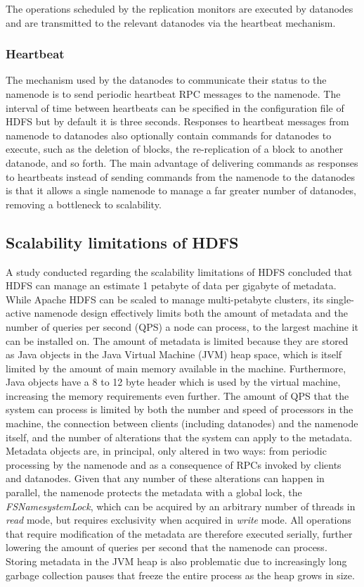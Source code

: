 The operations scheduled by the replication monitors are executed by datanodes and are transmitted to the relevant datanodes via the heartbeat mechanism.

\subsubsection{Heartbeat}
\label{sec:heartbeat}
The mechanism used by the datanodes to communicate their status to the namenode is to send periodic heartbeat RPC messages to the namenode.
The interval of time between heartbeats can be specified in the configuration file of HDFS but by default it is three seconds.
Responses to heartbeat messages from namenode to datanodes also optionally contain commands for datanodes to execute, such as the deletion of blocks, the re-replication of a block to another datanode, and so forth.
The main advantage of delivering commands as responses to heartbeats instead of sending commands from the namenode to the datanodes is that it allows a single namenode to manage a far greater number of datanodes, removing a bottleneck to scalability.

\subsection{Scalability limitations of HDFS}
\label{sec:scalability-limitations}
A study conducted regarding the scalability limitations of HDFS \cite{shvachko2010hdfs} concluded that HDFS can manage an estimate 1 petabyte of data per gigabyte of metadata.
While Apache HDFS can be scaled to manage multi-petabyte clusters, its single-active namenode design effectively limits both the amount of metadata and the number of queries per second (QPS) a node can process, to the largest machine it can be installed on.
The amount of metadata is limited because they are stored as Java objects in the Java Virtual Machine (JVM) heap space, which is itself limited by the amount of main memory available in the machine.
Furthermore, Java objects have a 8 to 12 byte header which is used by the virtual machine, increasing the memory requirements even further.
The amount of QPS that the system can process is limited by both the number and speed of processors in the machine, the connection between clients (including datanodes) and the namenode itself, and the number of alterations that the system can apply to the metadata.
Metadata objects are, in principal, only altered in two ways: from periodic processing by the namenode and as a consequence of RPCs invoked by clients and datanodes.
Given that any number of these alterations can happen in parallel, the namenode protects the metadata with a global lock, the \textit{FSNamesystemLock}, which can be acquired by an arbitrary number of threads in \emph{read} mode, but requires exclusivity when acquired in \emph{write} mode.
All operations that require modification of the metadata are therefore executed serially, further lowering the amount of queries per second that the namenode can process.
Storing metadata in the JVM heap is also problematic due to increasingly long garbage collection pauses that freeze the entire process as the heap grows in size.
